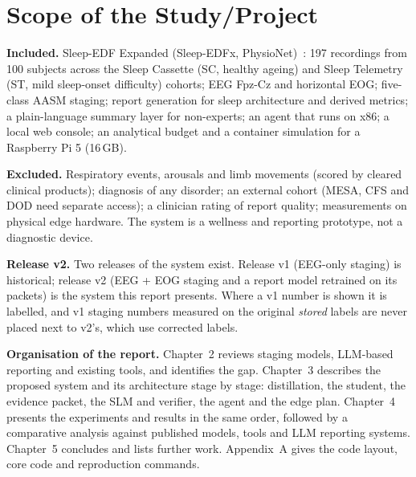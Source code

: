 \section{Scope of the Study/Project}

\textbf{Included.} Sleep-EDF Expanded (Sleep-EDFx, PhysioNet)~\cite{kemp2000sleepedf,goldberger2000physionet}: 197
recordings from 100 subjects across the Sleep Cassette (SC, healthy ageing) and Sleep Telemetry (ST, mild
sleep-onset difficulty) cohorts; EEG Fpz-Cz and horizontal EOG; five-class AASM staging; report generation for
sleep architecture and derived metrics; a plain-language summary layer for non-experts; an agent that runs on x86;
a local web console; an analytical budget and a container simulation for a Raspberry Pi 5 (16\,GB).

\textbf{Excluded.} Respiratory events, arousals and limb movements (scored by cleared clinical products); diagnosis
of any disorder; an external cohort (MESA, CFS and DOD need separate access); a clinician rating of report quality;
measurements on physical edge hardware. The system is a wellness and reporting prototype, not a diagnostic device.

\textbf{Release v2.} Two releases of the system exist. Release v1 (EEG-only staging) is historical; release v2
(EEG + EOG staging and a report model retrained on its packets) is the system this report presents. Where a v1
number is shown it is labelled, and v1 staging numbers measured on the original \emph{stored} labels are never
placed next to v2's, which use corrected labels.

\textbf{Organisation of the report.} Chapter~2 reviews staging models, LLM-based reporting and existing tools, and
identifies the gap. Chapter~3 describes the proposed system and its architecture stage by stage: distillation, the
student, the evidence packet, the SLM and verifier, the agent and the edge plan. Chapter~4 presents the experiments
and results in the same order, followed by a comparative analysis against published models, tools and LLM
reporting systems. Chapter~5 concludes and lists further work. Appendix~A gives the code layout, core code and
reproduction commands.
